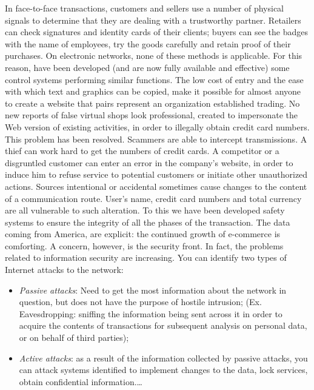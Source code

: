 \newline
In face-to-face transactions, customers and sellers use a number of physical signals to determine that they are dealing with a trustworthy partner. Retailers can check signatures and identity cards of their clients; buyers can see the badges with the name of employees, try the goods carefully and retain proof of their purchases. On electronic networks, none of these methods is applicable. For this reason, have been developed (and are now fully available and effective) some control systems performing similar functions.
\newline
The low cost of entry and the ease with which text and graphics can be copied, make it possible for almost anyone to create a website that pairs represent an organization established trading. No new reports of false virtual shops look professional, created to impersonate the Web version of existing activities, in order to illegally obtain credit card numbers. This problem has been resolved. Scammers are able to intercept transmissions. A thief can work hard to get the numbers of credit cards. A competitor or a disgruntled customer can enter an error in the company's website, in order to induce him to refuse service to potential customers or initiate other unauthorized actions. Sources intentional or accidental sometimes cause changes to the content of a communication route. User's name, credit card numbers and total currency are all vulnerable to such alteration. To this we have been developed safety systems to ensure the integrity of all the phases of the transaction. The data coming from America, are explicit: the continued growth of e-commerce is comforting. A concern, however, is the security front. In fact, the problems related to information security are increasing.
\newline
You can identify two types of Internet attacks to the network:
\begin{itemize}
  \item \emph{Passive attacks}: Need to get the most information about the network in question, but does not have the purpose of hostile intrusion; (Ex. Eavesdropping: sniffing the information being sent across it in order to acquire the contents of transactions for subsequent analysis on personal data, or on behalf of third parties);
  \item \emph{Active attacks}: as a result of the information collected by passive attacks, you can attack systems identified to implement changes to the data, lock services, obtain confidential information.\ldots
\end{itemize}
